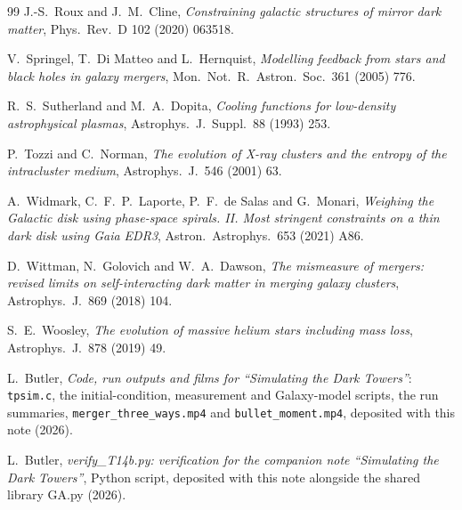 \documentclass[11pt]{article}
\theoremstyle{definition}
\newcommand{\file}[1]{\texttt{#1}}
\begin{document}
\begin{thebibliography}{99}
J.-S.~Roux and J.~M.~Cline,
\emph{Constraining galactic structures of mirror dark matter},
Phys.\ Rev.\ D 102 (2020) 063518.

V.~Springel, T.~Di Matteo and L.~Hernquist,
\emph{Modelling feedback from stars and black holes in galaxy mergers},
Mon.\ Not.\ R.\ Astron.\ Soc.\ 361 (2005) 776.

R.~S.~Sutherland and M.~A.~Dopita,
\emph{Cooling functions for low-density astrophysical plasmas},
Astrophys.\ J.\ Suppl.\ 88 (1993) 253.

P.~Tozzi and C.~Norman,
\emph{The evolution of X-ray clusters and the entropy of the intracluster medium},
Astrophys.\ J.\ 546 (2001) 63.

A.~Widmark, C.~F.~P.~Laporte, P.~F.~de Salas and G.~Monari,
\emph{Weighing the Galactic disk using phase-space spirals. II. Most stringent constraints on a thin dark disk using Gaia EDR3},
Astron.\ Astrophys.\ 653 (2021) A86.

D.~Wittman, N.~Golovich and W.~A.~Dawson,
\emph{The mismeasure of mergers: revised limits on self-interacting dark matter in merging galaxy clusters},
Astrophys.\ J.\ 869 (2018) 104.

S.~E.~Woosley,
\emph{The evolution of massive helium stars including mass loss},
Astrophys.\ J.\ 878 (2019) 49.

L.~Butler,
\emph{Code, run outputs and films for ``Simulating the Dark Towers''}: \file{tpsim.c}, the initial-condition, measurement and Galaxy-model scripts, the run summaries, \file{merger\_three\_ways.mp4} and \file{bullet\_moment.mp4},
deposited with this note (2026).

L.~Butler,
\emph{verify\_T14b.py: verification for the companion note ``Simulating the Dark Towers''},
Python script, deposited with this note alongside the shared library GA.py (2026).

\end{thebibliography}
\end{document}
